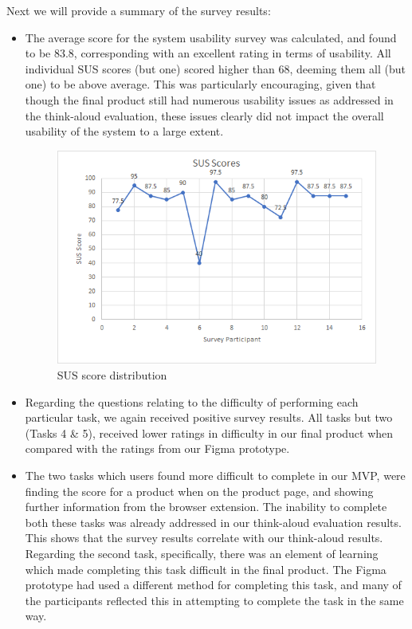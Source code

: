 \documentclass[a4,10pt,twocolumn]{article}
\begin{document}
Next we will provide a summary of the survey results:

\begin{itemize}
    \item The average score for the system usability survey was calculated, and found to be 83.8, corresponding with an excellent rating in terms of usability. All individual SUS scores (but one) scored higher than 68, deeming them all (but one) to be above average. This was particularly encouraging, given that though the final product still had numerous usability issues as addressed in the think-aloud evaluation, these issues clearly did not impact the overall usability of the system to a large extent.
    \begin{figure}[h]
        \centering
        \includegraphics[width=0.9\columnwidth]{assets/final/SUS_distribution.jpg}
        \caption{SUS score distribution}
    \end{figure}
    \item Regarding the questions relating to the difficulty of performing each particular task, we again received positive survey results. All tasks but two (Tasks 4 \& 5), received lower ratings in difficulty in our final product when compared with the ratings from our Figma prototype. 
    \item The two tasks which users found more difficult to complete in our MVP, were finding the score for a product when on the product page, and showing further information from the browser extension. The inability to complete both these tasks was already addressed in our think-aloud evaluation results. This shows that the survey results correlate with our think-aloud results. Regarding the second task, specifically, there was an element of learning which made completing this task difficult in the final product. The Figma prototype had used a different method for completing this task, and many of the participants reflected this in attempting to complete the task in the same way.
\end{itemize}
\end{document}
